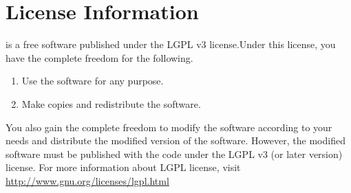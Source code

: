 \section{License Information}
\libalf is a free software published under the LGPL v3 license.Under this license, you have the complete freedom for the following.
\begin{enumerate}
 \item Use the software for any purpose.
 \item Make copies and redistribute the software.
\end{enumerate}
You also gain the complete freedom to modify the software according to your needs and distribute the modified version of the software. However, the modified software must be published with the code under the LGPL v3 (or later version) license. 
For more information about LGPL license, visit \url{http://www.gnu.org/licenses/lgpl.html}



